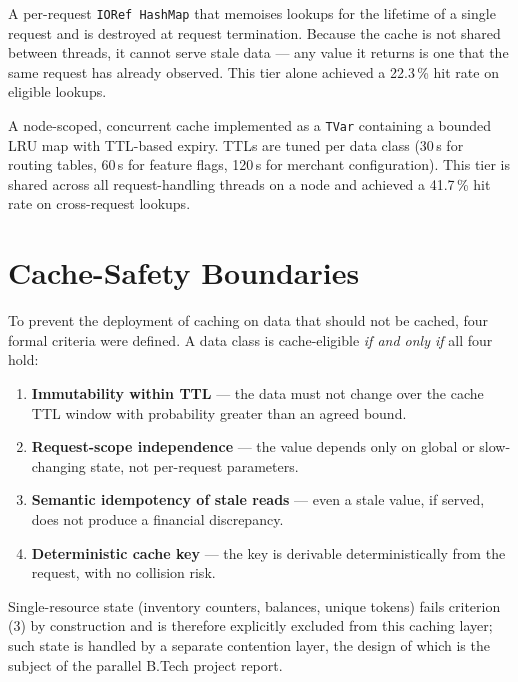 \documentclass[12pt,a4paper,oneside]{report}
\begin{document}
\begin{description}[leftmargin=*]
    \item[Tier 1 --- Thread-Level Cache.] A per-request \texttt{IORef HashMap} that memoises lookups for the lifetime of a single request and is destroyed at request termination. Because the cache is not shared between threads, it cannot serve stale data --- any value it returns is one that the same request has already observed. This tier alone achieved a 22.3\,\% hit rate on eligible lookups.
    \item[Tier 2 --- Server-Local Cache.] A node-scoped, concurrent cache implemented as a \texttt{TVar} containing a bounded LRU map with TTL-based expiry. TTLs are tuned per data class (30\,s for routing tables, 60\,s for feature flags, 120\,s for merchant configuration). This tier is shared across all request-handling threads on a node and achieved a 41.7\,\% hit rate on cross-request lookups.
\end{description}

\section{Cache-Safety Boundaries}

To prevent the deployment of caching on data that should not be cached, four formal criteria were defined. A data class is cache-eligible \emph{if and only if} all four hold:

\begin{enumerate}[leftmargin=*]
    \item \textbf{Immutability within TTL} --- the data must not change over the cache TTL window with probability greater than an agreed bound.
    \item \textbf{Request-scope independence} --- the value depends only on global or slow-changing state, not per-request parameters.
    \item \textbf{Semantic idempotency of stale reads} --- even a stale value, if served, does not produce a financial discrepancy.
    \item \textbf{Deterministic cache key} --- the key is derivable deterministically from the request, with no collision risk.
\end{enumerate}

Single-resource state (inventory counters, balances, unique tokens) fails criterion (3) by construction and is therefore explicitly excluded from this caching layer; such state is handled by a separate contention layer, the design of which is the subject of the parallel B.Tech project report.
\end{document}
